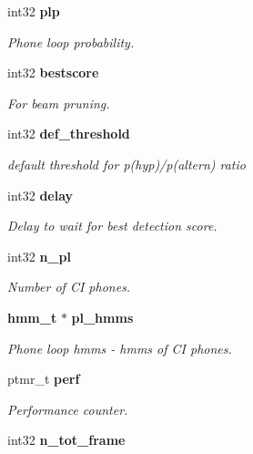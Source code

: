 \begin{DoxyCompactItemize}
int32 \textbf{ plp}
\begin{DoxyCompactList}\small\item\em Phone loop probability. \end{DoxyCompactList}\item 
\mbox{\label{structkws__search__s_a0a04bba471516468d1b2bea14632f255}} 
int32 \textbf{ bestscore}
\begin{DoxyCompactList}\small\item\em For beam pruning. \end{DoxyCompactList}\item 
\mbox{\label{structkws__search__s_afce4456a796dbc72149d7a47159ccca9}} 
int32 \textbf{ def\+\_\+threshold}
\begin{DoxyCompactList}\small\item\em default threshold for p(hyp)/p(altern) ratio \end{DoxyCompactList}\item 
\mbox{\label{structkws__search__s_acf2597fd017db4c2f90a9ba54e08a20c}} 
int32 \textbf{ delay}
\begin{DoxyCompactList}\small\item\em Delay to wait for best detection score. \end{DoxyCompactList}\item 
\mbox{\label{structkws__search__s_aab6e42d0c93af992c16e2a75db386df4}} 
int32 \textbf{ n\+\_\+pl}
\begin{DoxyCompactList}\small\item\em Number of CI phones. \end{DoxyCompactList}\item 
\mbox{\label{structkws__search__s_a7b501f4cc5f4efb7b4ca0259afcf4e05}} 
\textbf{ hmm\+\_\+t} $\ast$ \textbf{ pl\+\_\+hmms}
\begin{DoxyCompactList}\small\item\em Phone loop hmms -\/ hmms of CI phones. \end{DoxyCompactList}\item 
\mbox{\label{structkws__search__s_a0cc9f5fcc60e181adfef86acf781076d}} 
ptmr\+\_\+t \textbf{ perf}
\begin{DoxyCompactList}\small\item\em Performance counter. \end{DoxyCompactList}\item 
\mbox{\label{structkws__search__s_a3beeae471b3e24f61295844302fd0cbb}} 
int32 {\bfseries n\+\_\+tot\+\_\+frame}
\end{DoxyCompactItemize}


